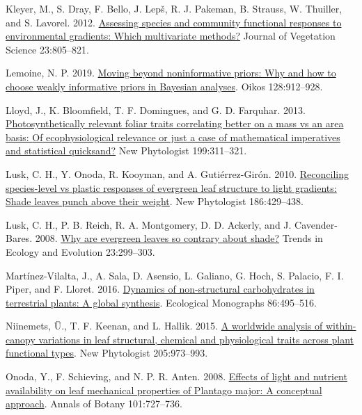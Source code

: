 \documentclass[
  12pt,
  a4paper,
,tablecaptionabove
]{scrartcl}
\newlength{\cslhangindent}
\newenvironment{CSLReferences}[2] %
 {%
  \setlength{\parindent}{0pt}
  \ifodd #1 \everypar{\setlength{\hangindent}{\cslhangindent}}\ignorespaces\fi
  \ifnum #2 > 0
  \setlength{\parskip}{#2\baselineskip}
  \fi
 }%
 {}
\begin{document}
\begin{CSLReferences}{1}{0}
\leavevmode{}%
Kleyer, M., S. Dray, F. Bello, J. Lepš, R. J. Pakeman, B. Strauss, W.
Thuiller, and S. Lavorel. 2012.
\href{https://doi.org/10.1111/j.1654-1103.2012.01402.x}{Assessing
species and community functional responses to environmental gradients:
{Which} multivariate methods?} Journal of Vegetation Science
23:805--821.

\leavevmode{}%
Lemoine, N. P. 2019. \href{https://doi.org/10.1111/oik.05985}{Moving
beyond noninformative priors: Why and how to choose weakly informative
priors in {Bayesian} analyses}. Oikos 128:912--928.

\leavevmode{}%
Lloyd, J., K. Bloomfield, T. F. Domingues, and G. D. Farquhar. 2013.
\href{https://doi.org/10.1111/nph.12281}{Photosynthetically relevant
foliar traits correlating better on a mass vs an area basis: {Of}
ecophysiological relevance or just a case of mathematical imperatives
and statistical quicksand?} New Phytologist 199:311--321.

\leavevmode{}%
Lusk, C. H., Y. Onoda, R. Kooyman, and A. Gutiérrez-Girón. 2010.
\href{https://doi.org/10.1111/j.1469-8137.2010.03202.x}{Reconciling
species-level vs plastic responses of evergreen leaf structure to light
gradients: {Shade} leaves punch above their weight}. New Phytologist
186:429--438.

\leavevmode{}%
Lusk, C. H., P. B. Reich, R. A. Montgomery, D. D. Ackerly, and J.
Cavender-Bares. 2008.
\href{https://doi.org/10.1016/j.tree.2008.02.006}{Why are evergreen
leaves so contrary about shade?} Trends in Ecology and Evolution
23:299--303.

\leavevmode{}%
Martínez-Vilalta, J., A. Sala, D. Asensio, L. Galiano, G. Hoch, S.
Palacio, F. I. Piper, and F. Lloret. 2016.
\href{https://doi.org/10.1002/ecm.1231}{Dynamics of non-structural
carbohydrates in terrestrial plants: A global synthesis}. Ecological
Monographs 86:495--516.

\leavevmode{}%
Niinemets, Ü., T. F. Keenan, and L. Hallik. 2015.
\href{https://doi.org/10.1111/nph.13096}{A worldwide analysis of
within-canopy variations in leaf structural, chemical and physiological
traits across plant functional types}. New Phytologist 205:973--993.

\leavevmode{}%
Onoda, Y., F. Schieving, and N. P. R. Anten. 2008.
\href{https://doi.org/10.1093/aob/mcn013}{Effects of light and nutrient
availability on leaf mechanical properties of {Plantago} major: {A}
conceptual approach}. Annals of Botany 101:727--736.


\end{CSLReferences}
\end{document}
